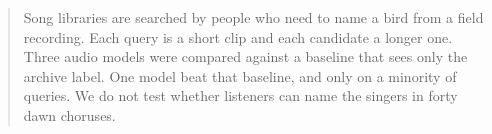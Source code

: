 \begin{abstract}
Song libraries are searched by people who need to name a bird from a field recording. Each query is a short clip and each candidate a longer one. Three audio models were compared against a baseline that sees only the archive label. One model beat that baseline, and only on a minority of queries. We do not test whether listeners can name the singers in forty dawn choruses.
\end{abstract}
